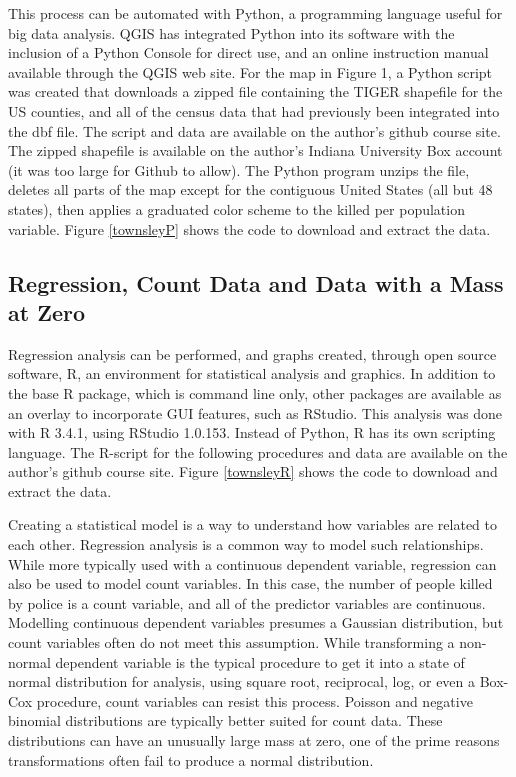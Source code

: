 \documentclass[sigconf]{acmart}
\begin{document}
This process can be automated with Python, a programming language useful for big data analysis. \cite{python}  QGIS has integrated Python into its software with the inclusion of a Python Console for direct use, and an online instruction manual available through the QGIS web site. \cite{pyqgis}  For the map in Figure 1, a Python script was created that downloads a zipped file containing the TIGER shapefile for the US counties, and all of the census data that had previously been integrated into the dbf file. The script and data are available on the author's github course site. \cite{townsleyP} The zipped shapefile is available on the author's Indiana University Box account (it was too large for Github to allow). \cite{townsley2} The Python program unzips the file, deletes all parts of the map except for the contiguous United States (all but 48 states), then applies a graduated color scheme to the killed per population variable.  Figure \ref{townsleyP} shows the code to download and extract the data.

\subsection{Regression, Count Data and Data with a Mass at Zero}
Regression analysis can be performed, and graphs created, through open source software, R, an environment for statistical analysis and graphics. \cite{r}  In addition to the base R package, which is command line only, other packages are available as an overlay to incorporate GUI features, such as RStudio. \cite{rstudio}  This analysis was done with R 3.4.1, using RStudio 1.0.153.  Instead of Python, R has its own scripting language.  The R-script for the following procedures and data are available on the author's github course site. \cite{townsleyR} Figure \ref{townsleyR} shows the code to download and extract the data.

Creating a statistical model is a way to understand how variables are related to each other.  Regression analysis is a common way to model such relationships.  While more typically used with a continuous dependent variable, regression can also be used to model count variables. \cite{kaminski05} In this case, the number of people killed by police is a count variable, and all of the predictor variables are continuous.  Modelling continuous dependent variables presumes a Gaussian distribution, but count variables often do not meet this assumption. \cite{fox15} While transforming a non-normal dependent variable is the typical procedure to get it into a state of normal distribution for analysis, using square root, reciprocal, log, or even a Box-Cox procedure, count variables can resist this process.  Poisson and negative binomial distributions are typically better suited for count data. \cite{martin17} These distributions can have an unusually large mass at zero, one of the prime reasons transformations often fail to produce a normal distribution. \cite{farewell17,beaujean16,gamlss,fox15,neelon16} 
\end{document}
